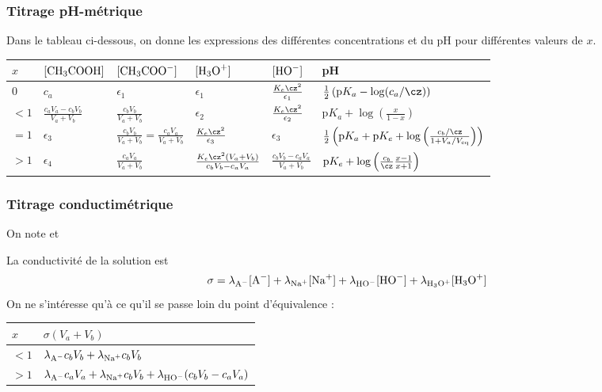 \documentclass{tp}
\newcommand{\pKa}{\ensuremath{\mathrm{p}K_a}}
\begin{document}
\subsubsection{Titrage pH-métrique}%
\label{ssub:titrage_ph_metrique}
Dans le tableau ci-dessous, on donne les expressions des différentes concentrations et du pH pour différentes valeurs de $x$. 
\begin{center}
  \begin{tabular}{llllll}
  \toprule
  $x$ & $[\ce{CH3COOH}]$ & $[\ce{CH3COO-}]$ & $[\ce{H3O+}]$ & $[\ce{HO-}]$& pH \\
  \midrule
  $0$ & $c_a$ & $\epsilon_1$ & $\epsilon_1$ & $\frac{K_e\cz^2}{\epsilon_1}$& $\frac{1}{2}\left( \pKa - \log(c_a/\cz) \right) $ \\ 
  $<1$  & $\frac{c_aV_a-c_bV_b}{V_a+V_b}$ & $\frac{c_bV_b}{V_a+V_b}$ & $\epsilon_2$ & $\frac{K_e\cz^2}{\epsilon_2}$& $\pKa + \log \left( \frac{x}{1-x} \right) $  \\
  $=1$  & $\epsilon_3$ & $\frac{c_bV_b}{V_a+V_b} = \frac{c_aV_a}{V_a+V_b}$ & $\frac{K_e\cz^2}{\epsilon_3}$ & $\epsilon_3$  & $\frac{1}{2}\left( \pKa + \mathrm{p}K_e +\log \left( \frac{c_b/\cz}{1+V_a/V_\text{eq}} \right)  \right) $  \\
  $>1$ & $\epsilon_4$ & $\frac{c_aV_a}{V_a+V_b}$ & $\frac{K_e \cz^2 (V_a+V_b)}{c_bV_b-c_aV_a}$ & $\frac{c_bV_b-c_aV_a}{V_a+V_b}$ & $\mathrm{p}K_e+\log\left( \frac{c_b}{\cz}\frac{x-1}{x+1} \right) $   \\
  \bottomrule
  \end{tabular}
\end{center}

\subsubsection{Titrage conductimétrique }%
\label{ssub:titrage_conductimetrique_}
On note  et 

La conductivité de la solution est 
\begin{equation}
  \sigma = \lambda_{\ce{A-}}[\ce{A-}] + \lambda_{\ce{Na+}}[\ce{Na+}] + \lambda_{\ce{HO-}} [\ce{HO-}] + \lambda_{\ce{H3O+}}[\ce{H3O+}]
\end{equation}
On ne s'intéresse qu'à ce qu'il se passe loin du point d'équivalence :
\begin{center}
  \begin{tabular}{ll}
    \toprule
    $x$ & $\sigma(V_a+V_b)$ \\
    \midrule
    $<1$ & $\lambda_{\ce{A-}}c_bV_b + \lambda_{\ce{Na+}}c_bV_b$ \\
    $>1$ & $\lambda_{\ce{A-}}c_aV_a + \lambda_{\ce{Na+}}c_bV_b + \lambda_{\ce{HO-}}(c_bV_b-c_aV_a)$\\ 
    \bottomrule
  \end{tabular}
\end{center}
\end{document}
